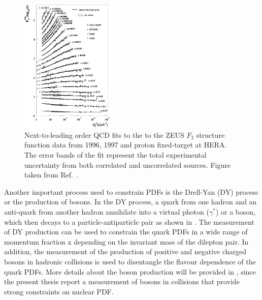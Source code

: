 \begin{figure}[!htb]
 \centering
 \includegraphics[width=0.4\textwidth]{Figures/Introduction/StandardModel/Structure_Function.png}
 \caption{Next-to-leading order QCD fits to the to the ZEUS $F_{2}$ structure function data from 1996, 1997 and proton fixed-target at HERA. The error bands of the fit represent the total experimental uncertainty from both correlated and uncorrelated sources. Figure taken from Ref.~\cite{HERAStrucFunc}.}
 \label{fig:HERAStrucFunc}
\end{figure}

Another important process used to constrain PDFs is the Drell-Yan (DY) process or the production of \Wb bosons. In the DY process, a quark from one hadron and an anti-quark from another hadron annihilate into a virtual photon ($\gamma^{*}$) or a \Z boson, which then decays to a particle-antiparticle pair as shown in . The measurement of DY production can be used to constrain the quark PDFs in a wide range of momentum fraction x depending on the invariant mass of the dilepton pair. In addition, the measurement of the production of positive and negative charged \Wb bosons in hadronic collisions is used to disentangle the flavour dependence of the quark PDFs. More details about the \Wb boson production will be provided in , since the present thesis report a measurement of \Wb bosons in \RunpPb collisions that provide strong constraints on nuclear PDF.

